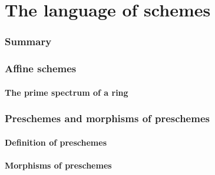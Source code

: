 \documentclass[10pt,oneside]{amsart}
\begin{document}
\setcounter{subsection}{0}
\part{The language of schemes}
    
    \section*{Summary}
    

    \section{Affine schemes}
       
       \subsection{The prime spectrum of a ring}

    \section{Preschemes and morphisms of preschemes}

        \subsection{Definition of preschemes}
        

        \subsection{Morphisms of preschemes}
        
\end{document}

